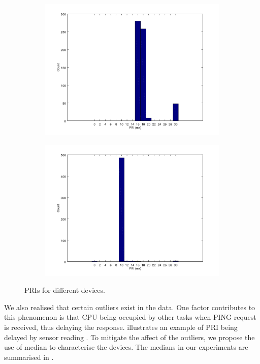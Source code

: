 \begin{figure}[ht!]
	\begin{subfigure}{0.45\linewidth}
		\includegraphics[width=\linewidth]{fig/helloworld_sky.png}
	\end{subfigure}
	\begin{subfigure}{0.45\linewidth}
		\includegraphics[width=\linewidth]{fig/helloworld_CC2538.png}
	\end{subfigure}
	\caption{PRIs for different devices. \label{PRIs}}
\end{figure}

We also realised that certain outliers exist in the data. One factor contributes to this phenomenon is that CPU being occupied by other tasks when PING request is received, thus delaying the response.   illustrates an example of PRI being delayed by sensor reading .  To mitigate the affect of the outliers, we propose the use of median to characterise the devices. The medians in our experiments are summarised in .

